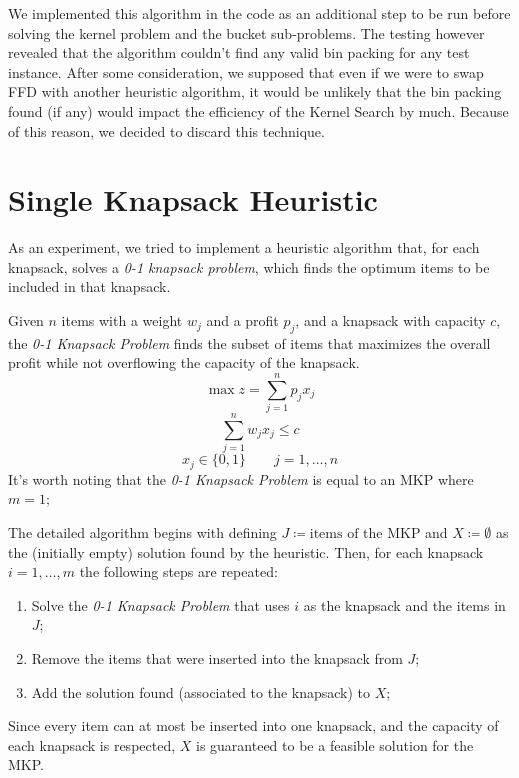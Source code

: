 We implemented this algorithm in the code as an additional step to be run
before solving the kernel problem and the bucket sub-problems.
The testing however revealed that the algorithm couldn't find any valid bin packing
for any test instance.
After some consideration, we supposed that even if we were to swap FFD with another
heuristic algorithm, it would be unlikely that the bin packing found (if any) would impact the efficiency of the
Kernel Search by much.
Because of this reason, we decided to discard this technique.


\section{Single Knapsack Heuristic}
As an experiment, we tried to implement a heuristic algorithm that,
for each knapsack, solves a \textit{0-1 knapsack problem},
which finds the optimum items to be included in that knapsack.

Given \(n\) items with a weight \(w_{j}\) and a profit \(p_{j}\),
and a knapsack with capacity \(c\), the \textit{0-1 Knapsack Problem} finds
the subset of items that maximizes the overall profit while not overflowing the capacity of the knapsack.
\begin{equation}
    \max{z} = \sum_{j=1}^{n} p_{j} x_{j}
\end{equation}
\begin{equation}
    \sum_{j=1}^{n} w_{j} x_{j} \leq c
\end{equation}
\begin{equation}
    x_{j} \in \{0,1\} \qquad j=1,\dots,n
\end{equation}
It's worth noting that the \textit{0-1 Knapsack Problem} is equal to an MKP
where \(m=1\);

The detailed algorithm begins with defining \(J \coloneqq \text{items of the MKP}\)
and \(X \coloneqq \emptyset\) as the (initially empty) solution found by the heuristic.
Then, for each knapsack \(i = 1,\dots,m\) the following steps are repeated:
\begin{enumerate}
    \item Solve the \textit{0-1 Knapsack Problem} that uses \(i\) as the knapsack and the items in \(J\);
    \item Remove the items that were inserted into the knapsack from \(J\);
    \item Add the solution found (associated to the knapsack) to \(X\);
\end{enumerate}
Since every item can at most be inserted into one knapsack, and the capacity of each
knapsack is respected, \(X\) is guaranteed to be a feasible solution for the MKP\@.

